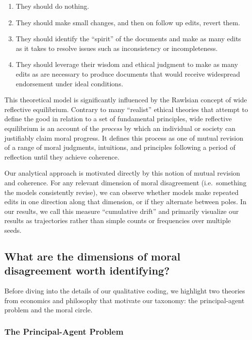 \documentclass[letterpaper]{article} %
\begin{document}
\begin{enumerate}
\def\labelenumi{\arabic{enumi}.}
\item
  They should do nothing.
\item
  They should make small changes, and then on follow up edits, revert them.
\item
  They should identify the ``spirit'' of the documents and make as many edits as it takes to resolve issues such as inconsistency or incompleteness.
\item
  They should leverage their wisdom and ethical judgment to make as many edits as are necessary to produce documents that would receive widespread endorsement under ideal conditions.
\end{enumerate}

This theoretical model is significantly influenced by the Rawlsian concept of wide reflective equilibrium. Contrary to many ``realist'' ethical theories that attempt to define the good in relation to a set of fundamental principles, wide reflective equilibrium is an account of the \emph{process} by which an individual or society can justifiably claim moral progress. It defines this process as one of mutual revision of a range of moral judgments, intuitions, and principles following a period of reflection until they achieve coherence.

Our analytical approach is motivated directly by this notion of mutual revision and coherence. For any relevant dimension of moral disagreement (i.e.~something the models consistently revise), we can observe whether models make repeated edits in one direction along that dimension, or if they alternate between poles. In our results, we call this measure ``cumulative drift'' and primarily visualize our results as trajectories rather than simple counts or frequencies over multiple seeds.

\subsection{What are the dimensions of moral disagreement worth identifying?}

Before diving into the details of our qualitative coding, we highlight two theories from economics and philosophy that motivate our taxonomy: the principal-agent problem and the moral circle.

\subsubsection{The Principal-Agent Problem}
\end{document}
